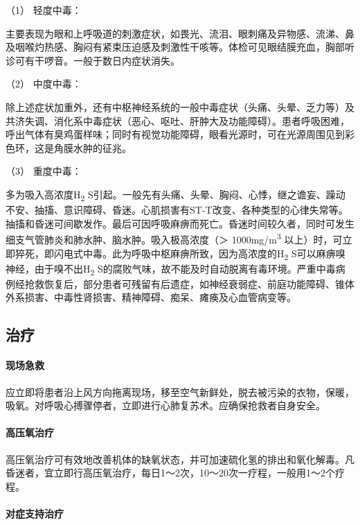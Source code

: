 \hypertarget{text00149.htmlux5cux23CHP5-4-3-2-2-1}{}
（1） 轻度中毒：

主要表现为眼和上呼吸道的刺激症状，如畏光、流泪、眼刺痛及异物感、流涕、鼻及咽喉灼热感、胸闷有紧束压迫感及刺激性干咳等。体检可见眼结膜充血，胸部听诊可有干啰音。一般于数日内症状消失。

\hypertarget{text00149.htmlux5cux23CHP5-4-3-2-2-2}{}
（2） 中度中毒：

除上述症状加重外，还有中枢神经系统的一般中毒症状（头痛、头晕、乏力等）及共济失调、消化系中毒症状（恶心、呕吐、肝肿大及功能障碍）。患者呼吸困难，呼出气体有臭鸡蛋样味；同时有视觉功能障碍，眼看光源时，可在光源周围见到彩色环，这是角膜水肿的征兆。

\hypertarget{text00149.htmlux5cux23CHP5-4-3-2-2-3}{}
（3） 重度中毒：

多为吸入高浓度H\textsubscript{2}
S引起。一般先有头痛、头晕、胸闷、心悸，继之谵妄、躁动不安、抽搐、意识障碍、昏迷。心肌损害有ST-T改变、各种类型的心律失常等。抽搐和昏迷可间歇发作。最后可因呼吸麻痹而死亡。昏迷时间较久者，同时可发生细支气管肺炎和肺水肿、脑水肿。吸入极高浓度（＞
1000mg/m\textsuperscript{3}
以上）时，可立即猝死，即闪电式中毒。此为呼吸中枢麻痹所致，因为高浓度的H\textsubscript{2}
S可以麻痹嗅神经，由于嗅不出H\textsubscript{2}
S的腐败气味，故不能及时自动脱离有毒环境。严重中毒病例经抢救恢复后，部分患者可残留有后遗症，如神经衰弱症、前庭功能障碍、锥体外系损害、中毒性肾损害、精神障碍、痴呆、瘫痪及心血管病变等。

\subsection{治疗}

\paragraph{现场急救}

应立即将患者沿上风方向拖离现场，移至空气新鲜处，脱去被污染的衣物，保暖，吸氧。对呼吸心搏骤停者，立即进行心肺复苏术。应确保抢救者自身安全。

\paragraph{高压氧治疗}

高压氧治疗可有效地改善机体的缺氧状态，并可加速硫化氢的排出和氧化解毒。凡昏迷者，宜立即行高压氧治疗，每日1～2次，10～20次一疗程，一般用1～2个疗程。

\paragraph{对症支持治疗}

